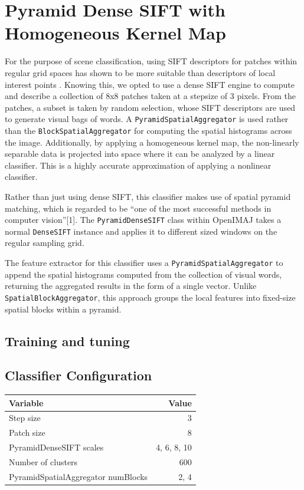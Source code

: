 \documentclass[a4paper]{article}
\begin{document}
\section{Pyramid Dense SIFT with Homogeneous Kernel Map}
For the purpose of scene classification, using SIFT descriptors for patches within regular grid spaces has shown to be more suitable than descriptors of local interest points \cite{lazebnik2006beyond, fei2005bayesian}. Knowing this, we opted to use a dense SIFT engine to compute and describe a collection of 8x8 patches taken at a stepsize of 3 pixels. From the patches, a subset is taken by random selection, whose SIFT descriptors are used to generate visual bags of words. A \texttt{PyramidSpatialAggregator} is used rather than the \texttt{BlockSpatialAggregator} for computing the spatial histograms across the image. Additionally, by applying a homogeneous kernel map, the non-linearly separable data is projected into space where it can be analyzed by a linear classifier. This is a highly accurate approximation of applying a nonlinear classifier.

Rather than just using dense SIFT, this classifier makes use of spatial pyramid matching, which is regarded to be ``one of the most successful methods in computer vision''[1]. The \texttt{PyramidDenseSIFT} class within OpenIMAJ takes a normal \texttt{DenseSIFT} instance and applies it to different sized windows on the regular sampling grid.

The feature extractor for this classifier uses a \texttt{PyramidSpatialAggregator} to append the spatial histograms computed from the collection of visual words, returning the aggregated results in the form of a single vector. Unlike \texttt{SpatialBlockAggregator}, this approach groups the local features into fixed-size spatial blocks within a pyramid.

\subsection{Training and tuning}

\subsection{Classifier Configuration}
\begin{center}
	\def\arraystretch{1.5}%
    \begin{tabular}{ | l | r |}
    \hline
    \textbf{Variable} & \textbf{Value} \\ \hline
    Step size & 3 \\ \hline
    Patch size & 8 \\ \hline
    PyramidDenseSIFT scales & 4, 6, 8, 10 \\ \hline
    Number of clusters & 600 \\ \hline
    PyramidSpatialAggregator numBlocks & 2, 4 \\ \hline
    \end{tabular}
\end{center}
\end{document}
